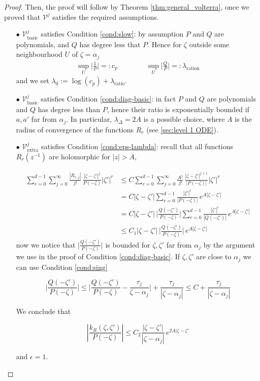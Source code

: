 \documentclass{article}
\theoremstyle{plain}
\newcommand{\volterra}{\mathcal{V}}
\newcommand{\hardpart}{\mathcal{V}_\text{basic}}
\newcommand{\softpart}{\mathcal{V}_\text{extra}}
\begin{document}
\begin{proof}
Then, the proof will follow by Theorem \ref{thm:general_volterra}, once we proved that $\volterra^j$ satisfies the required assumptions.  

\begin{enumerate}
    \item[$\bullet$] $\hardpart^j$ satisfies Condition \eqref{cond:slow}: by assumption $P$ and $Q$ are polynomials, and $Q$ has degree less that $P$. Hence for $\zeta$ outside some neighbourhood $U$ of $\zeta=\alpha_j$  
\begin{align*}
    \sup_U \Big\vert \frac{1}{P}\Big\vert =:c_p \qquad\qquad \sup_U \Big\vert\frac{Q}{P}\Big\vert =:\lambda_\text{ration} 
\end{align*}
    and we set $\lambda_0:=\log(c_p)+\lambda_\text{ratio}$. 
    \item[$\bullet$] $\hardpart^j$ satisfies Condition \eqref{cond:diag-basic}: in fact $P$ and $Q$ are polynomials and $Q$ has degree less than $P$, hence their ratio is exponentially bounded if $a,a'$ far from $\alpha_j$. In particular, $\lambda_\Delta=2A$ is a possible choice, where $A$ is the radius of convergence of the functions $R_r$ (see \ref{sec:level 1 ODE}).    
    \item[$\bullet$]  $\softpart^j$ satisfies Condition \eqref{cond:eps-lambda}: recall that all functions $R_r(z^{-1})$ are holomorphic for $|z|>A$, 

    \begin{align*}
        \sum_{r=0}^{d-1}\sum_{j=0}^\infty \frac{| R_{r,j}|}{j!} \, \frac{|\zeta-\zeta'|^j}{P(-\zeta)}|\zeta'|^r  &\leq C \sum_{r=0}^{d-1}\sum_{j=0}^\infty \frac{A^j}{j!} \, \frac{|\zeta-\zeta'|^{j+1}}{|P(-\zeta)|}|\zeta'|^r \\
        & =C |\zeta-\zeta'| \sum_{r=0}^{d-1} \frac{|\zeta'|^r}{|P(-\zeta)|}\,  e^{A |\zeta-\zeta'|}\\
        &=C |\zeta-\zeta'| \, \Big\vert \frac{Q(-\zeta')}{P(-\zeta)}\Big\vert \sum_{r=0}^{d-1} \frac{|\zeta'|^r}{|Q(-\zeta')|} \, e^{A |\zeta-\zeta'|}\\
        &\leq C_1 |\zeta-\zeta'| \, \Big\vert \frac{Q(-\zeta')}{P(-\zeta)}\Big\vert \,  e^{A |\zeta-\zeta'|}
    \end{align*}
now we notice that $\Big\vert \frac{Q(-\zeta')}{P(-\zeta)}\Big\vert$ is bounded for $\zeta,\zeta'$ far from $\alpha_j$ by the argument we use in the proof of Condition \eqref{cond:diag-basic}. If $\zeta,\zeta'$ are close to $\alpha_j$ we can use Condition \eqref{cond:sing}

\[    \Big\vert \frac{Q(-\zeta')}{P(-\zeta)}\Big\vert  \leq \Big\vert \frac{Q(-\zeta')}{P(-\zeta)} -\frac{\tau_j}{\zeta-\alpha_j}\Big\vert + \frac{\tau_j}{|\zeta-\alpha_j|}\leq C +  \frac{\tau_j}{|\zeta-\alpha_j|} \]

We conclude that 

\[\left\vert \frac{k_R(\zeta,\zeta')}{P(-\zeta)}\right\vert\leq C_2 \frac{|\zeta-\zeta'|}{|\zeta-\alpha_j|}\, e^{2A |\zeta-\zeta'} \]

and $\epsilon=1$.

\end{enumerate}



\end{proof}
\end{document}
